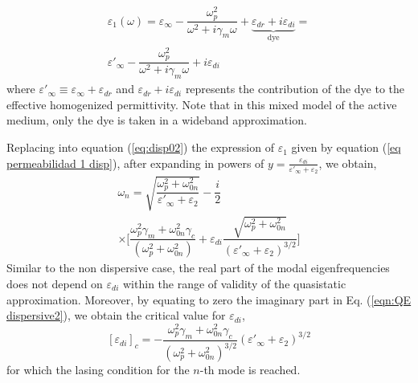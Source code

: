 \documentclass[9pt,twocolumn,twoside]{osajnl}
\begin{document}
\begin{align}
\label{eq permeabilidad 1 disp}
\varepsilon_1(\omega) = \varepsilon_\infty - \dfrac{\omega^2_p}{\omega^2 + i\gamma_m \omega} + \underbrace{\varepsilon_{dr} + i\varepsilon_{di}}_{\text{dye}} = \nonumber \\
 \varepsilon'_\infty - \dfrac{\omega^2_p}{\omega^2 + i\gamma_m \omega} + i\varepsilon_{di}
\end{align}
where $\varepsilon'_\infty \equiv \varepsilon_\infty + \varepsilon_{dr}$ and $\varepsilon_{dr} + i\varepsilon_{di}$ represents the contribution of the dye to the effective homogenized permittivity. Note that in this mixed model of the active medium, only the dye is taken in a wideband approximation.

Replacing into equation (\ref{eq:disp02}) the expression of $\varepsilon_1$ given by equation (\ref{eq permeabilidad 1 disp}), after expanding in powers of $y=\frac{\varepsilon_{di}}{\varepsilon'_\infty+\varepsilon_2}$, we obtain, 
%
\begin{align}
\label{eqn:QE dispersive2}
\omega_{n}= \sqrt{\dfrac{\omega^2_p+\omega^2_{0n}}{\varepsilon'_\infty+\varepsilon_2}}-\dfrac{i}{2} \nonumber\\ %
\times \Big[ \dfrac{\omega^2_p\gamma_m+\omega^2_{0n}\gamma_c}{(\omega^2_p+\omega^2_{0n})}+  \varepsilon_{di} \dfrac{\sqrt{\omega^2_p+\omega^2_{0n} }}{(\varepsilon'_\infty+\varepsilon_2)^{3/2}} \Big]
\end{align}
%
%
Similar to the non dispersive case, the real part of the modal eigenfrequencies does not depend on  $\varepsilon_{di}$ within the range of validity of the quasistatic approximation. Moreover, by equating to zero the imaginary part in Eq. (\ref{eqn:QE dispersive2}), we obtain the critical value for $\varepsilon_{di}$,
%
\begin{equation}
\label{eqn: frecuency crit QE dispersive}
[\varepsilon_{di}]_c = - \dfrac{\omega^2_p\gamma_m+\omega^2_{0n}\gamma_c}{(\omega^2_p+\omega^2_{0n})^{3/2}}(\varepsilon'_\infty+\varepsilon_2)^{3/2}
\end{equation}
%
for which the lasing condition for the $n$-th mode is reached. 
\end{document}
